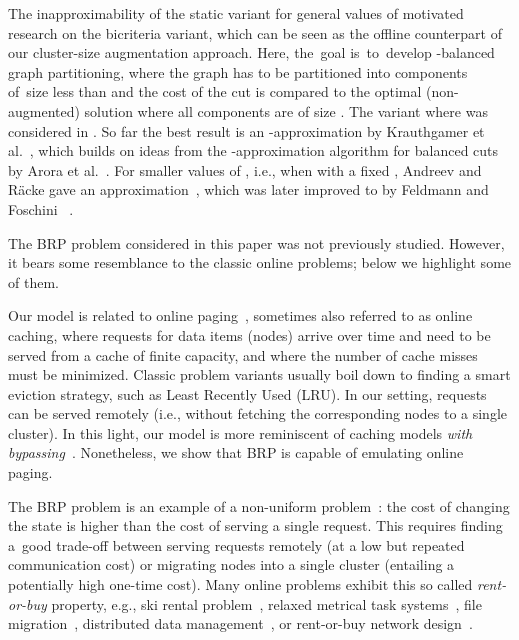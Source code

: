 \documentclass{siamart190516}
\begin{document}
The inapproximability of the static variant for general values of 
motivated research on the bicriteria variant, which can be seen as the offline
counterpart of our cluster-size augmentation approach. Here, the~goal
is~to~develop -balanced graph partitioning, where the graph has
to be partitioned into  components of~size less than  and the cost of the cut is compared to the optimal (non-augmented)
solution where all components are of size . The variant where
 was considered in
\cite{LeMaTr90,SimTen97,EvNaRS00,EvNaRS99,KrNaSc09}. So far the best result is
an -approximation by Krauthgamer et
al.~\cite{KrNaSc09}, which builds on ideas from the -approximation algorithm for balanced cuts by Arora et al.~\cite{ArRaVa09}.
For smaller values of , i.e., when  with a fixed
, Andreev and R{\"{a}}cke gave an 
approximation~\cite{AndRae06}, which was later improved to  by
Feldmann and Foschini ~\cite{FelFos15}.

The BRP problem considered in this paper was not previously studied. However,
it bears some resemblance to the classic online problems; below we highlight
some of them.

Our model is related to online
paging~\cite{SleTar85,FKLMSY91,McGSle91,AcChNo00}, sometimes also referred to
as online caching, where requests for data items (nodes) arrive over time and
need to be served from a cache of finite capacity, and where the number of
cache misses must be minimized. Classic problem variants usually boil down to
finding a smart eviction strategy, such as Least Recently Used (LRU). In our
setting, requests can be served remotely (i.e., without fetching the
corresponding nodes to a single cluster). In this light, our model is more
reminiscent of caching models \emph{with
bypassing}~\cite{EpImLN11,EpImLN15,Irani02}. Nonetheless, we show that BRP is
capable of emulating online paging.

The BRP problem is an example of a non-uniform problem~\cite{KaMaMO94}: the
cost of changing the state is higher than the cost of serving a single
request. This requires finding a~good trade-off between serving requests
remotely (at a low but repeated communication cost) or migrating nodes into a
single cluster (entailing a potentially high one-time cost). Many
online problems exhibit this so called \emph{rent-or-buy} property, e.g., ski
rental problem~\cite{KaMaMO94,LoPaRa08}, relaxed metrical task
systems~\cite{BaChIn01}, file migration~\cite{BaChIn01,BiByMu17}, distributed
data management~\cite{BaFiRa95,AwBaFi93,AwBaFi98}, or rent-or-buy network
design~\cite{AwAzBa04,Umboh15,FeWiLe16}.
\end{document}
